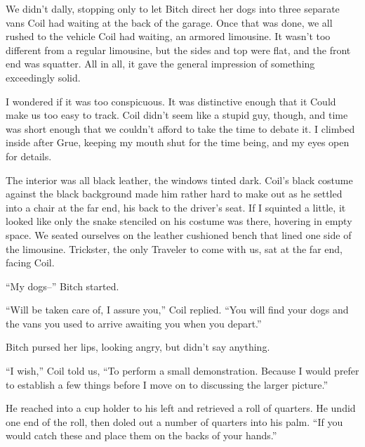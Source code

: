 





We didn't dally, stopping only to let Bitch direct her dogs into three separate vans Coil had waiting at the back of the garage.  Once that was done, we all rushed to the vehicle Coil had waiting, an armored limousine.  It wasn't too different from a regular limousine, but the sides and top were flat, and the front end was squatter.  All in all, it gave the general impression of something exceedingly solid.



I wondered if it was too conspicuous.  It was distinctive enough that it Could make us too easy to track.  Coil didn't seem like a stupid guy, though, and time was short enough that we couldn't afford to take the time to debate it.  I climbed inside after Grue, keeping my mouth shut for the time being, and my eyes open for details.



The interior was all black leather, the windows tinted dark.  Coil's black costume against the black background made him rather hard to make out as he settled into a chair at the far end, his back to  the driver's seat.  If I squinted a little, it looked like only the snake stenciled on his costume was there, hovering in empty space.  We seated ourselves on the leather cushioned bench that lined one side of the limousine.  Trickster, the only Traveler to come with us, sat at the far end, facing Coil.



``My dogs--'' Bitch started.



``Will be taken care of, I assure you,'' Coil replied.  ``You will find your dogs and the vans you used to arrive awaiting you when you depart.''



Bitch pursed her lips, looking angry, but didn't say anything.



``I wish,'' Coil told us, ``To perform a small demonstration.  Because I would prefer to establish a few things before I move on to discussing the larger picture.''



He reached into a cup holder to his left and retrieved a roll of quarters.  He undid one end of the roll, then doled out a number of quarters into his palm.  ``If you would catch these and place them on the backs of your hands.''



